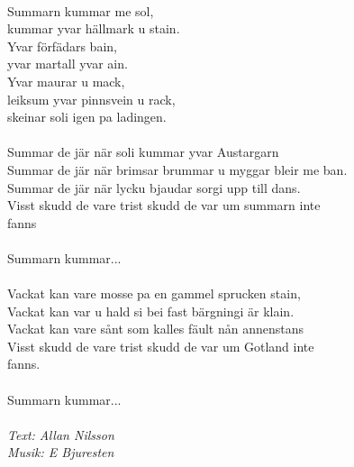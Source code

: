 \vspace{10pt}\\
Summarn kummar me sol,\\
kummar yvar hällmark u stain.\\
Yvar förfädars bain,\\
yvar martall yvar ain.\\
Yvar maurar u mack,\\
leiksum yvar pinnsvein u rack,\\
skeinar soli igen pa ladingen.\\
\\
Summar de jär när soli kummar yvar Austargarn\\
Summar de jär när brimsar brummar u myggar bleir me ban.\\
Summar de jär när lycku bjaudar sorgi upp till dans.\\
Visst skudd de vare trist skudd de var um summarn inte \\
fanns\\
\\
Summarn kummar...\\
\\
Vackat kan vare mosse pa en gammel sprucken stain,\\
Vackat kan var u hald si bei fast bärgningi är klain.\\
Vackat kan vare sånt som kalles fäult nån annenstans\\
Visst skudd de vare trist skudd de var um Gotland inte \\
fanns.\\
\\
Summarn kummar...\\
\\
{\footnotesize\textit{Text: Allan Nilsson\\ Musik: E Bjuresten}}
